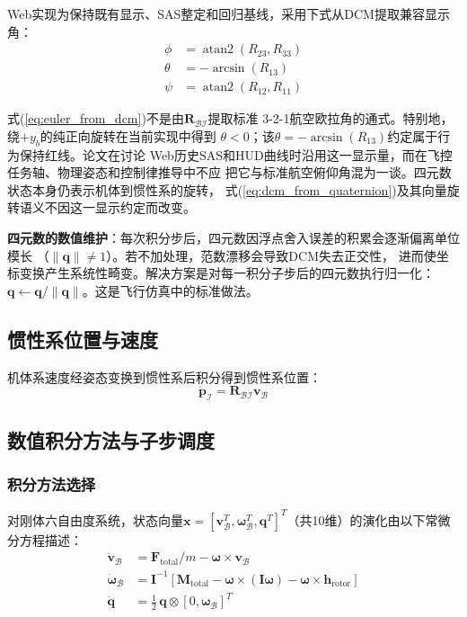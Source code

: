 Web实现为保持既有显示、SAS整定和回归基线，采用下式从DCM提取兼容显示角：
\begin{equation}
    \begin{aligned}
        \phi &= \operatorname{atan2}(R_{23}, R_{33}) \\
        \theta &= -\arcsin(R_{13}) \\
        \psi &= \operatorname{atan2}(R_{12}, R_{11})
    \end{aligned}
    \label{eq:euler_from_dcm}
\end{equation}

式(\ref{eq:euler_from_dcm})不是由$\bm R_{\mathcal{B}\mathcal{I}}$提取标准
3-2-1航空欧拉角的通式。特别地，绕$+y_b$的纯正向旋转在当前实现中得到
$\theta<0$；该$\theta=-\arcsin(R_{13})$约定属于行为保持红线。论文在讨论
Web历史SAS和HUD曲线时沿用这一显示量，而在飞控任务轴、物理姿态和控制律推导中不应
把它与标准航空俯仰角混为一谈。四元数状态本身仍表示机体到惯性系的旋转，
式(\ref{eq:dcm_from_quaternion})及其向量旋转语义不因这一显示约定而改变。

\textbf{四元数的数值维护}：每次积分步后，四元数因浮点舍入误差的积累会逐渐偏离单位模长
（$\|\bm{q}\| \neq 1$）。若不加处理，范数漂移会导致DCM失去正交性，
进而使坐标变换产生系统性畸变。解决方案是对每一积分子步后的四元数执行归一化：
$\bm{q} \leftarrow \bm{q} / \|\bm{q}\|$。这是飞行仿真中的标准做法。

\subsection{惯性系位置与速度}

机体系速度经姿态变换到惯性系后积分得到惯性系位置：
\begin{equation}
    \dot{\bm{p}}_{\mathcal{I}} = \bm{R}_{\mathcal{B}\mathcal{I}} \bm{v}_{\mathcal{B}}
    \label{eq:position_integration}
\end{equation}

\subsection{数值积分方法与子步调度}

\subsubsection{积分方法选择}

对刚体六自由度系统，状态向量$\mathbf{x}=[\mathbf{v}_{\mathcal{B}}^T,\boldsymbol{\omega}_{\mathcal{B}}^T,\mathbf{q}^T]^T$（共10维）的演化由以下常微分方程描述：
\begin{align}
    \dot{\mathbf{v}}_{\mathcal{B}} &= \mathbf{F}_{\text{total}}/m - \boldsymbol{\omega}\times\mathbf{v}_{\mathcal{B}} \\
    \dot{\boldsymbol{\omega}}_{\mathcal{B}} &= \mathbf{I}^{-1}\left[\mathbf{M}_{\text{total}} - \boldsymbol{\omega}\times(\mathbf{I}\boldsymbol{\omega}) - \boldsymbol{\omega}\times\mathbf{h}_{\text{rotor}}\right] \\
    \dot{\mathbf{q}} &= \frac{1}{2}\,\mathbf{q}\otimes[0,\boldsymbol{\omega}_{\mathcal{B}}]^T
\end{align}

